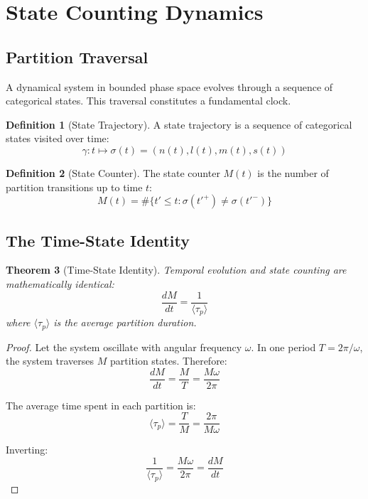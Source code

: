 \documentclass[twocolumn,10pt,a4paper]{article}
\newtheorem{theorem}{Theorem}[section]
\theoremstyle{definition}
\newtheorem{definition}[theorem]{Definition}
\theoremstyle{remark}
\begin{document}
\section{State Counting Dynamics}
\label{sec:counting}

\subsection{Partition Traversal}

A dynamical system in bounded phase space evolves through a sequence of categorical states. This traversal constitutes a fundamental clock.

\begin{definition}[State Trajectory]
A state trajectory is a sequence of categorical states visited over time:
\begin{equation}
    \gamma: t \mapsto \sigma(t) = (n(t), l(t), m(t), s(t))
\end{equation}
\end{definition}

\begin{definition}[State Counter]
The state counter $M(t)$ is the number of partition transitions up to time $t$:
\begin{equation}
    M(t) = \#\{t' \leq t : \sigma(t'^+) \neq \sigma(t'^-)\}
\end{equation}
\end{definition}

\subsection{The Time-State Identity}

\begin{theorem}[Time-State Identity]
\label{thm:time_state}
Temporal evolution and state counting are mathematically identical:
\begin{equation}
    \frac{dM}{dt} = \frac{1}{\langle\tau_p\rangle}
\end{equation}
where $\langle\tau_p\rangle$ is the average partition duration.
\end{theorem}

\begin{proof}
Let the system oscillate with angular frequency $\omega$. In one period $T = 2\pi/\omega$, the system traverses $M$ partition states. Therefore:
\begin{equation}
    \frac{dM}{dt} = \frac{M}{T} = \frac{M\omega}{2\pi}
\end{equation}

The average time spent in each partition is:
\begin{equation}
    \langle\tau_p\rangle = \frac{T}{M} = \frac{2\pi}{M\omega}
\end{equation}

Inverting:
\begin{equation}
    \frac{1}{\langle\tau_p\rangle} = \frac{M\omega}{2\pi} = \frac{dM}{dt}
\end{equation}
\end{proof}
\end{document}
